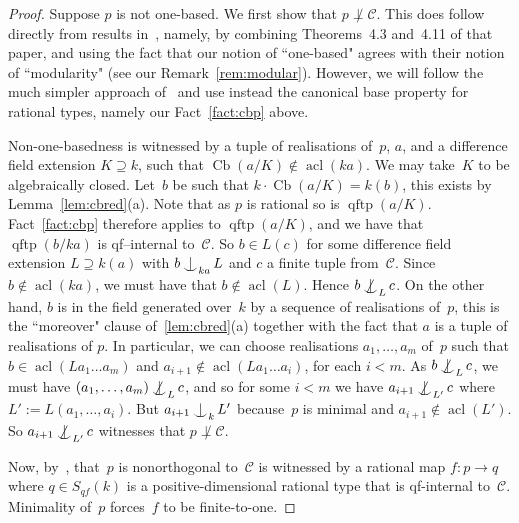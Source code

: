 \documentclass[\DocOpts]{amsart}
\theoremstyle{definition}
\def\cb{\operatorname{Cb}}
\def\qftp{\operatorname{qftp}}
\def\acl{\operatorname{acl}}
\def\C{\mathcal{C}}
\newcommand{\<}{\langle}
\renewcommand{\>}{\rangle}
\def\Ind#1#2{#1\setbox0=\hbox{\(#1x\)}\kern\wd0\hbox to 
0pt{\hss\(#1\mid\)\hss}\lower.9\ht0\hbox to 
0pt{\hss\(#1\smile\)\hss}\kern\wd0}
\def\ind{\mathop{\mathpalette\Ind{}}}
\def\notind#1#2{#1\setbox0=\hbox{\(#1x\)}\kern\wd0\hbox to 
0pt{\mathchardef\nn=12854\hss\(#1\nn\)\kern1.4\wd0\hss}\hbox to 
0pt{\hss\(#1\mid\)\hss}\lower.9\ht0 \hbox to 
0pt{\hss\(#1\smile\)\hss}\kern\wd0}
\def\nind{\mathop{\mathpalette\notind{}}}
\begin{document}
\begin{proof}
    Suppose $p$ is not one-based.
    We first show that $p\not\perp\C$.
    This does follow directly from results in~\cite{acfa}, namely, by combining Theorems~4.3 and~4.11 of that paper, and using the fact that our notion of ``one-based" agrees with their notion of ``modularity" (see our Remark~\ref{rem:modular}).
    However, we will follow the much simpler approach of~\cite{pillay-ziegler} and use instead the canonical base property for rational types, namely our Fact~\ref{fact:cbp} above.
    
        Non-one-basedness is witnessed by a tuple of realisations of~$p$, $a$, and a difference field extension $K\supseteq k$, such that $\cb(a/K)\not\in\acl(ka)$.
    We may take~$K$ to be algebraically closed.
    Let~$b$ be such that $k\cdot\cb(a/K)=k(b)$, this exists by 
    Lemma~\ref{lem:cbred}(a).
    Note that as $p$ is rational so is $\qftp(a/K)$.
    Fact~\ref{fact:cbp} therefore applies to $\qftp(a/K)$, and we have that $\qftp(b/ka)$ is qf--internal to~$\C$.
    So $b\in L(c)$ for some difference field extension $L\supseteq k(a)$ with $b\ind_{ka}L$ and $c$ a finite tuple from~$\C$.
    Since $b\notin\acl(ka)$, we must have that $b\notin\acl(L)$.
    Hence $b\nind_Lc$.   
    On the other hand, $b$ is in the field generated over~$k$ by a sequence of realisations of~$p$, this is the ``moreover" clause of~\ref{lem:cbred}(a) together with the fact that $a$ is a tuple of realisations of $p$.
    In particular, we can choose realisations $a_1,\dots,a_m$ of~$p$ such that $b\in\acl(La_1\dots a_m)$ and $a_{i+1}\notin\acl(La_1\dots a_i)$, for each $i<m$.
As $b\nind_Lc$, we must have $(a_1,\dots,a_m)\nind_Lc$, and so for some $i<m$ we have $a_{i+1}\nind_{L'}c$ where $L':=L(a_1,\dots,a_i)$.
But $a_{i+1}\ind_kL'$ because~$p$ is minimal and $a_{i+1}\notin\acl(L')$.
So $a_{i+1}\nind_{L'}c$ witnesses that $p\not\perp\C$.

Now, by~\cite[Proposition~2.11]{qfint}, that~$p$ is nonorthogonal to~$\C$ is witnessed by a rational map \(f:p\to q\) where $q\in S_{qf}(k)$ is a positive-dimensional rational type that is qf-internal to~\(\C\).
Minimality of~$p$ forces~$f$ to be finite-to-one.


\end{proof}
\end{document}
